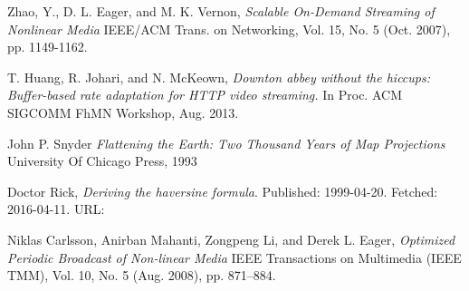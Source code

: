 \documentclass[9pt,a4paper]{acmproc}
\begin{document}
\begin{thebibliography}{9}
Zhao, Y., D. L. Eager, and M. K. Vernon,
	\emph{Scalable On-Demand Streaming of 
Nonlinear Media}
	\newline
	 IEEE/ACM Trans. on Networking, Vol. 15, No. 5 (Oct. 
2007), pp. 1149-1162.

T. Huang, R. Johari, and N. McKeown,
	\emph{ Downton abbey without the hiccups: Buffer-based rate adaptation for HTTP video streaming.}
	\newline
	 In Proc. ACM SIGCOMM FhMN
Workshop, Aug. 2013.

John P. Snyder
	\emph{Flattening the Earth: Two Thousand Years of Map Projections}
	\newline
	University Of Chicago Press, 1993
	
Doctor Rick,
	\emph{Deriving the haversine formula}.
	\newline
	Published: 1999-04-20. Fetched: 2016-04-11.
	\newline
	URL: 

Niklas Carlsson, Anirban Mahanti, Zongpeng Li, and Derek L. Eager,
	\emph{Optimized Periodic Broadcast of Non-linear Media}
	\newline
	IEEE Transactions on Multimedia (IEEE TMM), Vol. 10, No. 5 (Aug. 2008), pp. 871--884.




\end{thebibliography}

\thispagestyle{empty}
\end{document}
